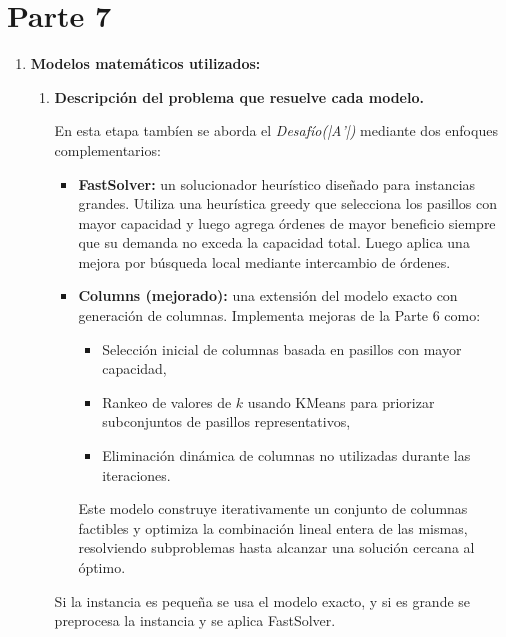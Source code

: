 \documentclass[a4paper,12pt]{article}
\begin{document}
\clearpage

\section{Parte 7}
\label{sec:variante5}

\begin{enumerate}[label=(\alph*), leftmargin=2em]
    \item \textbf{Modelos matemáticos utilizados:}
    \begin{enumerate}[label=\roman*., leftmargin=0.2em]
    
        \item \textbf{Descripción del problema que resuelve cada modelo.}
        
        En esta etapa tambíen se aborda el \textit{Desafío(|A'|)} mediante dos enfoques complementarios:

        \begin{itemize}
            \item \textbf{FastSolver:} un solucionador heurístico diseñado para instancias grandes. Utiliza una heurística greedy que selecciona los pasillos con mayor capacidad y luego agrega órdenes de mayor beneficio siempre que su demanda no exceda la capacidad total. Luego aplica una mejora por búsqueda local mediante intercambio de órdenes.
            
            \item \textbf{Columns (mejorado):} una extensión del modelo exacto con generación de columnas. Implementa mejoras de la Parte 6 como:
            \begin{itemize}
                \item Selección inicial de columnas basada en pasillos con mayor capacidad,
                \item Rankeo de valores de \(k\) usando KMeans para priorizar subconjuntos de pasillos representativos,
                \item Eliminación dinámica de columnas no utilizadas durante las iteraciones.
            \end{itemize}
            Este modelo construye iterativamente un conjunto de columnas factibles y optimiza la combinación lineal entera de las mismas, resolviendo subproblemas hasta alcanzar una solución cercana al óptimo.
        \end{itemize}

         Si la instancia es pequeña se usa el modelo exacto, y si es grande se preprocesa la instancia y se aplica FastSolver.


\end{enumerate}
\end{enumerate}
\end{document}

